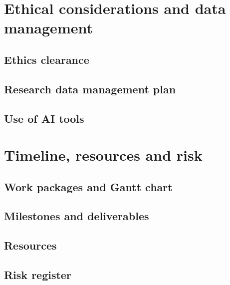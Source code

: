 \documentclass[11pt,a4paper]{article}
\begin{document}
\section{Ethical considerations and data management}
\subsection{Ethics clearance}
\subsection{Research data management plan}
\subsection{Use of AI tools}

\section{Timeline, resources and risk}
\subsection{Work packages and Gantt chart}
\subsection{Milestones and deliverables}
\subsection{Resources}
\subsection{Risk register}
\end{document}
